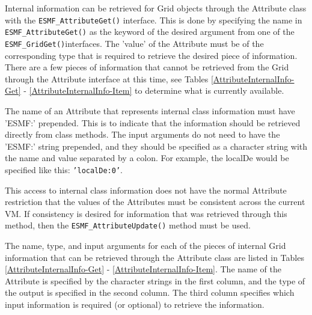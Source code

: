 
\label{sec:InternalInfo}

Internal information can be retrieved for Grid objects through the Attribute 
class with the {\tt ESMF\_AttributeGet()} interface.  This is done by 
specifying the name in {\tt ESMF\_AttributeGet()} as the keyword of the 
desired argument from one of the {\tt ESMF\_GridGet()}interfaces.  
The 'value' of the Attribute must be of the corresponding type
that is required to retrieve the desired piece of information.  There are 
a few pieces of information that cannot be retrieved from the Grid
through the Attribute interface at this time, see Tables 
\ref{AttributeInternalInfo-Get} - \ref{AttributeInternalInfo-Item} to
determine what is currently available.

The name of an Attribute that represents internal class information must have 
'ESMF:' prepended.  This is to indicate that the information should be retrieved
directly from class methods.  The input arguments do not need to have the 'ESMF:'
string prepended, and they should be specified as a character string with the name
and value separated by a colon.  For example, the localDe would be specified 
like this: {\tt 'localDe:0'}.

This access to internal class information does not
have the normal Attribute restriction that the values of the Attributes must be
consistent across the current VM.  If consistency is desired for information that
was retrieved through this method, then the {\tt ESMF\_AttributeUpdate()} method
must be used.

The name, type, and input arguments for each of the pieces of internal
Grid information that can be retrieved through the Attribute class are listed
in Tables \ref{AttributeInternalInfo-Get} - \ref{AttributeInternalInfo-Item}.
The name of the Attribute is specified by the character strings in the first 
column, and the type of the output is specified in the second column.
The third column specifies which input information is 
required (or optional) to retrieve the information.

